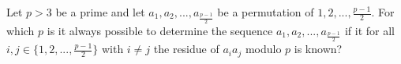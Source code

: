 Let $p>3$ be a prime and let $a_1,a_2,...,a_{\frac{p-1}{2}}$ be a permutation of $1,2,...,\frac{p-1}{2}$. For which $p$ is it always possible to determine the sequence $a_1,a_2,...,a_{\frac{p-1}{2}}$ if it for all $i,j\in\{1,2,...,\frac{p-1}{2}\}$ with $i\not=j$ the residue of $a_ia_j$ modulo $p$ is known?